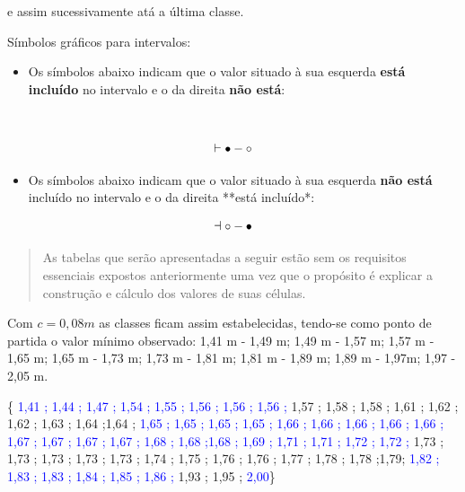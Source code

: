 \documentclass[
]{book}
\providecommand{\tightlist}{%
  \setlength{\itemsep}{0pt}\setlength{\parskip}{0pt}}
\begin{document}
\hfill\break

e assim sucessivamente atá a última classe.

\hfill\break

Símbolos gráficos para intervalos:

\hfill\break

\begin{itemize}
\tightlist
\item
  Os símbolos abaixo indicam que o valor situado à sua esquerda \textbf{está incluído} no intervalo e o da direita \textbf{não está}:
\end{itemize}

~

\[
\vdash \\
{\bullet}-{\circ}
\]

\hfill\break

\begin{itemize}
\tightlist
\item
  Os símbolos abaixo indicam que o valor situado à sua esquerda \textbf{não está} incluído no intervalo e o da direita **está incluído*:
\end{itemize}

\hfill\break

\[
\dashv  \\
{\circ}-{\bullet}
\]

\hfill\break

\begin{quote}
As tabelas que serão apresentadas a seguir estão sem os requisitos essenciais expostos anteriormente uma vez que o propósito é explicar a construção e cálculo dos valores de suas células.
\end{quote}

\hfill\break

Com \(c=0,08m\) as classes ficam assim estabelecidas, tendo-se como ponto de partida o valor mínimo observado: 1,41 m - 1,49 m; 1,49 m - 1,57 m; 1,57 m - 1,65 m; 1,65 m - 1,73 m; 1,73 m - 1,81 m; 1,81 m - 1,89 m; 1,89 m - 1,97m; 1,97 - 2,05 m.

\hfill\break

\{
\textcolor{blue}{ 1,41 ; 1,44 ; 1,47 ; 1,54 ; 1,55 ; 1,56 ; 1,56 ; 1,56 ;} 1,57 ; 1,58 ; 1,58 ; 1,61 ; 1,62 ; 1,62 ; 1,63 ; 1,64 ;1,64 ; \textcolor{blue}{ 1,65 ; 1,65 ; 1,65 ; 1,65 ; 1,66 ; 1,66 ; 1,66 ; 1,66 ; 1,66 ; 1,67 ; 1,67 ; 1,67 ; 1,67 ; 1,68 ; 1,68 ;1,68 ; 1,69 ; 1,71 ; 1,71 ; 1,72 ; 1,72 ;} 1,73 ; 1,73 ; 1,73 ; 1,73 ; 1,73 ; 1,74 ; 1,75 ; 1,76 ; 1,76 ; 1,77 ; 1,78 ; 1,78 ;1,79; \textcolor{blue}{1,82 ; 1,83 ; 1,83 ; 1,84 ; 1,85 ; 1,86  ;} 1,93 ; 1,95 ; \textcolor{blue}{2,00}\}
\end{document}
